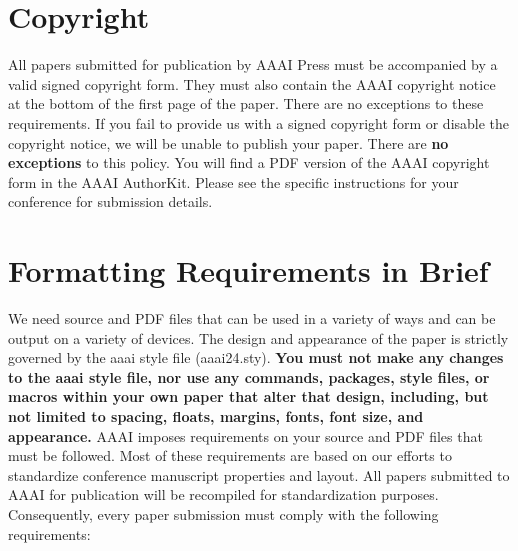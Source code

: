 \documentclass[letterpaper]{article} %
\begin{document}
{\section{Copyright}
All papers submitted for publication by AAAI Press must be accompanied by a valid signed copyright form. They must also contain the AAAI copyright notice at the bottom of the first page of the paper. There are no exceptions to these requirements. If you fail to provide us with a signed copyright form or disable the copyright notice, we will be unable to publish your paper. There are \textbf{no exceptions} to this policy. You will find a PDF version of the AAAI copyright form in the AAAI AuthorKit. Please see the specific instructions for your conference for submission details.

\section{Formatting Requirements in Brief}
We need source and PDF files that can be used in a variety of ways and can be output on a variety of devices. The design and appearance of the paper is strictly governed by the aaai style file (aaai24.sty).
\textbf{You must not make any changes to the aaai style file, nor use any commands, packages, style files, or macros within your own paper that alter that design, including, but not limited to spacing, floats, margins, fonts, font size, and appearance.} AAAI imposes requirements on your source and PDF files that must be followed. Most of these requirements are based on our efforts to standardize conference manuscript properties and layout. All papers submitted to AAAI for publication will be recompiled for standardization purposes. Consequently, every paper submission must comply with the following requirements:

}
\end{document}
